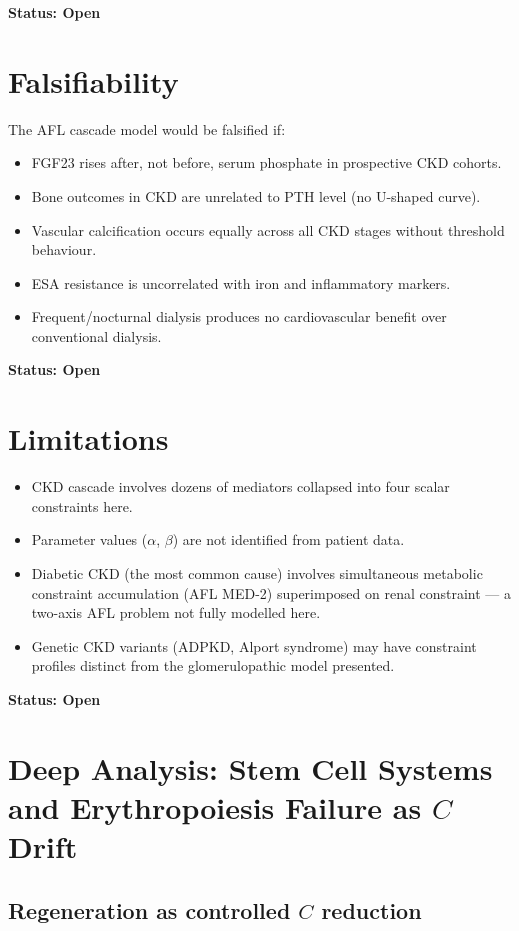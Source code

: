 \documentclass[12pt,a4paper]{article}
\begin{document}
\textbf{Status: Open}

\section{Falsifiability}

The AFL cascade model would be falsified if:
\begin{itemize}
    \item FGF23 rises after, not before, serum phosphate in prospective CKD cohorts.
    \item Bone outcomes in CKD are unrelated to PTH level (no U-shaped curve).
    \item Vascular calcification occurs equally across all CKD stages without threshold behaviour.
    \item ESA resistance is uncorrelated with iron and inflammatory markers.
    \item Frequent/nocturnal dialysis produces no cardiovascular benefit over conventional dialysis.
\end{itemize}

\textbf{Status: Open}

\section{Limitations}

\begin{itemize}
    \item CKD cascade involves dozens of mediators collapsed into four scalar constraints here.
    \item Parameter values ($\alpha$, $\beta$) are not identified from patient data.
    \item Diabetic CKD (the most common cause) involves simultaneous metabolic constraint accumulation (AFL MED-2) superimposed on renal constraint --- a two-axis AFL problem not fully modelled here.
    \item Genetic CKD variants (ADPKD, Alport syndrome) may have constraint profiles distinct from the glomerulopathic model presented.
\end{itemize}

\textbf{Status: Open}


\section{Deep Analysis: Stem Cell Systems and Erythropoiesis Failure as $C$ Drift}
\subsection{Regeneration as controlled $C$ reduction}
\end{document}
